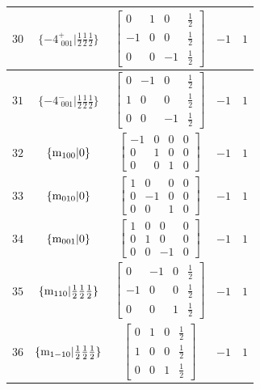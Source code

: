 \documentclass[fleqn,8pt]{jsarticle}
\begin{document}
\begin{longtable}{ccccc}
$ 30 $ & $ \{-4^{+}_{\,\,001}|\frac{1}{2} \frac{1}{2} \frac{1}{2}\} $ & $ \begin{bmatrix} 0 & 1 & 0 & \frac{1}{2} \\ -1 & 0 & 0 & \frac{1}{2} \\ 0 & 0 & -1 & \frac{1}{2} \end{bmatrix} $ & $ -1 $ & $ 1 $ \\ \hline
$ 31 $ & $ \{-4^{-}_{\,\,001}|\frac{1}{2} \frac{1}{2} \frac{1}{2}\} $ & $ \begin{bmatrix} 0 & -1 & 0 & \frac{1}{2} \\ 1 & 0 & 0 & \frac{1}{2} \\ 0 & 0 & -1 & \frac{1}{2} \end{bmatrix} $ & $ -1 $ & $ 1 $ \\ \hline
$ 32 $ & $ \{{\rm m}_{100}|0\} $ & $ \begin{bmatrix} -1 & 0 & 0 & 0 \\ 0 & 1 & 0 & 0 \\ 0 & 0 & 1 & 0 \end{bmatrix} $ & $ -1 $ & $ 1 $ \\ \hline
$ 33 $ & $ \{{\rm m}_{010}|0\} $ & $ \begin{bmatrix} 1 & 0 & 0 & 0 \\ 0 & -1 & 0 & 0 \\ 0 & 0 & 1 & 0 \end{bmatrix} $ & $ -1 $ & $ 1 $ \\ \hline
$ 34 $ & $ \{{\rm m}_{001}|0\} $ & $ \begin{bmatrix} 1 & 0 & 0 & 0 \\ 0 & 1 & 0 & 0 \\ 0 & 0 & -1 & 0 \end{bmatrix} $ & $ -1 $ & $ 1 $ \\ \hline
$ 35 $ & $ \{{\rm m}_{110}|\frac{1}{2} \frac{1}{2} \frac{1}{2}\} $ & $ \begin{bmatrix} 0 & -1 & 0 & \frac{1}{2} \\ -1 & 0 & 0 & \frac{1}{2} \\ 0 & 0 & 1 & \frac{1}{2} \end{bmatrix} $ & $ -1 $ & $ 1 $ \\ \hline
$ 36 $ & $ \{{\rm m}_{1-10}|\frac{1}{2} \frac{1}{2} \frac{1}{2}\} $ & $ \begin{bmatrix} 0 & 1 & 0 & \frac{1}{2} \\ 1 & 0 & 0 & \frac{1}{2} \\ 0 & 0 & 1 & \frac{1}{2} \end{bmatrix} $ & $ -1 $ & $ 1 $ \\ \hline

\end{longtable}
\end{document}
